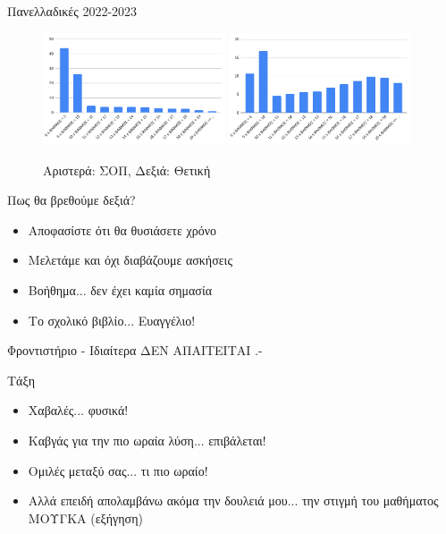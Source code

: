 \documentclass[greek]{beamer}
\begin{document}
\begin{frame}{Πανελλαδικές 2022-2023}
      \begin{figure}
            \centering
            \includegraphics[width=0.48\textwidth]{"images/panelladikes22sop.png"}
            \includegraphics[width=0.48\textwidth]{"images/panelladikes22thet.png"}
            \caption{Αριστερά: ΣΟΠ, Δεξιά: Θετική}
      \end{figure}
\end{frame}

\begin{frame}{Πως θα βρεθούμε δεξιά?}
      \begin{itemize}
            \item Αποφασίστε ότι θα θυσιάσετε χρόνο \pause
            \item Μελετάμε και όχι διαβάζουμε ασκήσεις \pause
            \item Βοήθημα... δεν έχει καμία σημασία \pause
            \item Το σχολικό βιβλίο... Ευαγγέλιο!
      \end{itemize}
\end{frame}

\begin{frame}{Φροντιστήριο - Ιδιαίτερα}
      \centering
      ΔΕΝ ΑΠΑΙΤΕΙΤΑΙ .-

\end{frame}

\begin{frame}{Τάξη}
      \begin{itemize}
            \item Χαβαλές... φυσικά! \pause
            \item Καβγάς για την πιο ωραία λύση... επιβάλεται! \pause
            \item Ομιλές μεταξύ σας... τι πιο ωραίο! \pause
            \item Αλλά επειδή απολαμβάνω ακόμα την δουλειά μου... την στιγμή του μαθήματος ΜΟΥΓΚΑ (εξήγηση)
      \end{itemize}
\end{frame}
\end{document}
